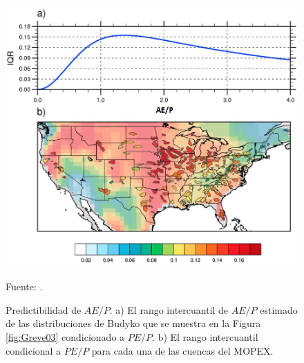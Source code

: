 \begin{figure}[ht!]
\centering
	\includegraphics[scale=0.62]{Images/Greve04.png}
	\caption{Predictibilidad de $AE/P$. a) El rango intercuantil de $AE/P$ estimado de las distribuciones de Budyko que se muestra en la Figura \ref{fig:Greve03} condicionado a $PE/P$. b) El rango intercuantil condicional a $PE/P$ para cada una de las cuencas del MOPEX.}
	Fuente: \citet{Greve2015}.
	\label{fig:Greve04}
\end{figure}